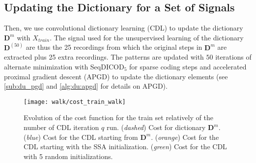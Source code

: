 \documentclass[../thesis.tex]{subfiles}
\begin{document}
\subsection{Updating the Dictionary for a Set of Signals}
\label{sub:walk:tweak_D}

Then, we use convolutional dictionary learning (CDL) to update the dictionary $\pmb D^{m}$ with $X_{train}$. The signal used for the unsupervised learning of the dictionary $\pmb D^{(50)}$ are thus the 25 recordings from which the original steps in $\pmb D^{m}$ are extracted plus 25 extra recordings. The patterns are updated with $50$ iterations of alternate minimization with SeqDICOD$_5$ for sparse coding steps and accelerated proximal gradient descent (APGD) to update the dictionary elements (see \autoref{sub:du_pgd} and \autoref{alg:du:apgd} for details on APGD).

\begin{figure}[htp]
\centering
\texttt{[image: walk/cost\_train\_walk]}
\caption{Evolution of the cost function for the train set relatively of the number of CDL iteration $q$ run. (\emph{dashed}) Cost for dictionary $\pmb D^{m}$. (\emph{blue}) Cost for the CDL starting from $\pmb D^{m}$. (\emph{orange}) Cost for the CDL starting with the SSA initialization. (\emph{green}) Cost for the CDL with 5 random initializations.}
\label{fig:walk:cost_train_walk}
\end{figure}
\end{document}
